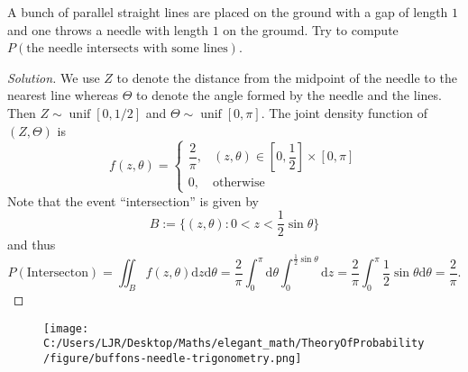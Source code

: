 \documentclass[11pt,singlecolumn, openany, citestyle=authoryear]{elegantbook}
\begin{document}
\begin{CJK}{UTF8}{gbsn}
\begin{example}
    A bunch of parallel straight lines are placed on the ground with a gap of length $1$
    and one throws a needle with length $1$ on the groumd.
    Try to compute $P(\text{the needle intersects with some lines})$.
\end{example}
\begin{proof}[Solution]
    We use $Z$ to denote the distance from the midpoint of the needle to the 
    nearest line whereas $\varTheta$ to denote the angle formed by the needle and the lines.
    Then $Z\sim \operatorname{unif}[0,1/2]$ and $\varTheta  \sim\operatorname{unif}[0,\pi]$.
    The joint density function of $(Z,\varTheta)$ is 
    $$f(z,\theta)=
    \begin{cases}
        \dfrac{2}{\pi}, & (z,\theta) \in [0,\dfrac{1}{2}]\times [0,\pi]\\
        0, & \text{otherwise}
    \end{cases}
    $$ 
    Note that the event ``intersection'' is given by 
    $$
    B:=\{(z,\theta): 0  < z < \frac{1}{2}\sin\theta\}
    $$
    and thus 
    $$
    P(\text{Intersecton}) = \iint_B f(z,\theta)\mathrm{d}z\mathrm{d}\theta = 
    \frac{2}{\pi}\int_0^\pi \mathrm{d}\theta \int_{0}^{\frac{1}{2}\sin\theta}\mathrm{d}z 
    =\frac{2}{\pi} \int_0^\pi \frac{1}{2}\sin\theta \mathrm{d}\theta=\frac{2}{\pi}.
    $$
\end{proof}
\begin{figure}[h]
    \centering
    \texttt{[image: C:/Users/LJR/Desktop/Maths/elegant\_math/TheoryOfProbability/figure/buffons-needle-trigonometry.png]}
\end{figure}


\end{CJK}
\end{document}
